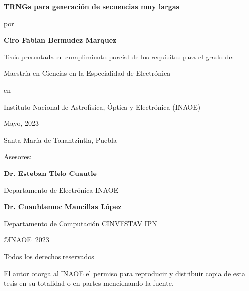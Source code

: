 \documentclass[12pt,a4paper]{report}
\newcommand{\Ptitle}{TRNGs para generación de secuencias muy largas}
\newcommand{\Pauthor}{Ciro Fabian Bermudez Marquez}
\newcommand{\Pdegree}{Maestría en Ciencias en la Especialidad de Electrónica}
\newcommand{\Padvisor}{Dr. Esteban Tlelo Cuautle}
\newcommand{\Pcoadvisor}{Dr. Cuauhtemoc Mancillas López}
\newcommand{\Pdepartmentadvisor}{Departamento de Electrónica INAOE}
\newcommand{\Pdepartmentcoadvisor}{Departamento de Computación CINVESTAV IPN}
\newcommand{\Pinstitution}{Instituto Nacional de Astrofísica, Óptica y Electrónica (INAOE)}
\newcommand{\Pmonth}{Mayo, }
\newcommand{\Pyear}{2023}
\newcommand{\Paddres}{Santa María de Tonantzintla, Puebla}
\newlength{\vertical}\setlength{\vertical}{0.8cm}
\begin{document}
\begin{titlepage}
    \begin{center}
        {\Large\bf\Ptitle\par}
        \vspace{\vertical}
        
        {por\par}
        \vspace{\vertical}
        
        {\bf\Pauthor\par}
        \vspace{\vertical}
        
        {Tesis presentada en cumplimiento parcial de los requisitos para el grado de:\par}
        \vspace{\vertical}
        
        {\Pdegree\par}
        \vspace{\vertical}
        
        {en\par}
        \vspace{\vertical}
        
        {\Pinstitution\par}
        \vspace{\vertical}
        
        {\Pmonth\Pyear\par}
        \vspace{\vertical}
    
        {\Paddres\par}        
        \vspace{\vertical}
        
        {Asesores:\par}
        \vspace{\vertical}
        
        {\bf\Padvisor\par}
        {\Pdepartmentadvisor\par}
        \vspace{\vertical}
        
        {\bf\Pcoadvisor\par}
        {\Pdepartmentcoadvisor\par}
        \vspace{\vertical}
        
        {\copyright INAOE~\Pyear\par}
        {Todos los derechos reservados\par}
        {El autor otorga al INAOE el permiso para reproducir y distribuir copia de esta tesis en su totalidad o en partes mencionando la
fuente.\par}
    \end{center}

\end{titlepage}

\end{document}
